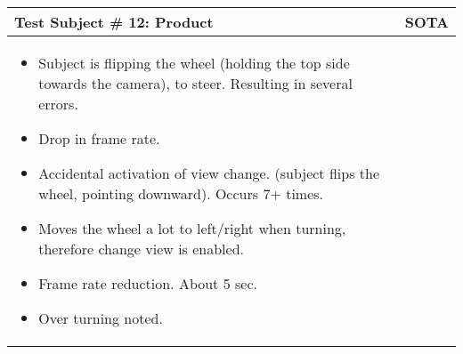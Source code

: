 \begin{table}[!htbp]
\centering
\begin{tabular}{| p{3.4in} | p{2in} |}
\hline
	\textbf{Test Subject \# 12: Product} & \textbf{SOTA}\\
\hline
	\begin{itemize}
		\item Subject is flipping the wheel (holding the top side towards the camera), to steer. Resulting in several errors.
		\item Drop in frame rate.
		\item Accidental activation of view change. (subject flips the wheel, pointing downward). Occurs 7+ times.
		\item Moves the wheel a lot to left/right when turning, therefore change view is enabled.
		\item Frame rate reduction. About 5 sec.
		\item Over turning noted.
	\end{itemize}
	&

	\\
\hline
\end{tabular}
\end{table}